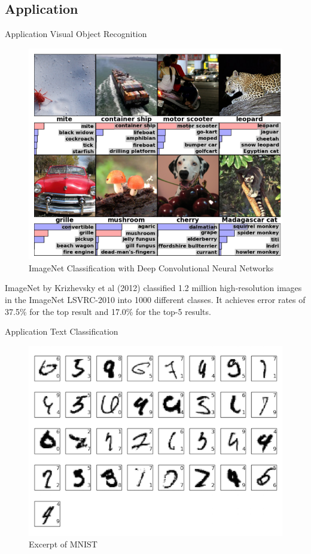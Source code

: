 \documentclass[12pt]{beamer}
\begin{document}
%
%


\subsection{Application}
\begin{frame}{Application}
Visual Object Recognition
\begin{figure}
\centering
\includegraphics[width = 0.4\linewidth]{images/KSH-results.png}
\caption{ImageNet Classification with Deep Convolutional
Neural Networks}
\label{fig:principle}
\end{figure}
ImageNet by Krizhevsky et al (2012) classified 1.2 million
high-resolution images in the ImageNet LSVRC-2010 into 1000 different classes.
It achieves error rates of 37.5\% for the top result and 17.0\% for the top-5 results.



\end{frame}

\begin{frame}{Application}
Text Classification
\begin{figure}
\centering
\includegraphics[width = 0.4\linewidth]{images/mnist.png}
\caption{Excerpt of MNIST}
\label{fig:principle}
\end{figure}
\end{frame}
\end{document}
